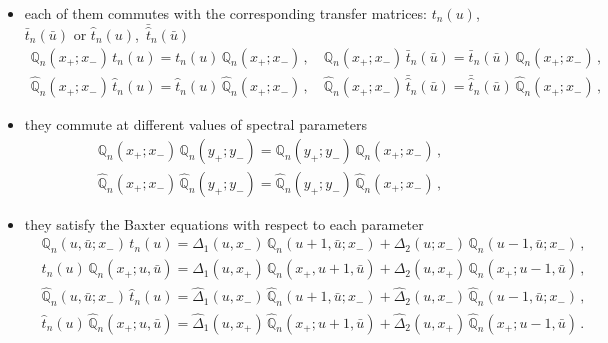 \documentclass[a4paper,11pt]{article}
\numberwithin{equation}{section}
\begin{document}
\begin{itemize}
	\item each of them commutes with the corresponding transfer matrices: $t_n(u)$,~$\bar{t}_n(\bar{u})$ or $\hat{t}_n(u)$,~$\bar{\hat{t}}_n(\bar{u})$
		\begin{equation} \label{qtcom}
			\begin{aligned}
				\mathbb{Q}_n(x_+;x_-)\,t_n(u) = t_n(u)\,\mathbb{Q}_n(x_+;x_-) \,, \quad  \mathbb{Q}_n(x_+;x_-)\,\bar{t}_n(\bar{u}) = \bar{t}_n(\bar{u})\,\mathbb{Q}_n(x_+;x_-) \,, \\
				\hat{\mathbb{Q}}_n(x_+;x_-)\,\hat{t}_n(u) = \hat{t}_n(u)\,\hat{\mathbb{Q}}_n(x_+;x_-) \,, \quad  \hat{\mathbb{Q}}_n(x_+;x_-)\,\bar{\hat{t}}_n(\bar{u}) = \bar{\hat{t}}_n(\bar{u})\,\hat{\mathbb{Q}}_n(x_+;x_-) \,,
			\end{aligned}	
		\end{equation}	
	\item they commute at different values of spectral parameters
		\begin{align}
			& \nonumber
			\mathbb{Q}_n(x_+;x_-)\,\mathbb{Q}_n(y_+;y_-) = \mathbb{Q}_n(y_+;y_-)\,\mathbb{Q}_n(x_+;x_-) \,, \\
			& \label{qqcom}
			\hat{\mathbb{Q}}_n(x_+;x_-)\,\hat{\mathbb{Q}}_n(y_+;y_-) = \hat{\mathbb{Q}}_n(y_+;y_-)\,\hat{\mathbb{Q}}_n(x_+;x_-) \,,
		\end{align}	
	\item they satisfy the Baxter equations with respect to each parameter
		\begin{align}
		\nonumber
		& \mathbb{Q}_n(u,\bar{u};x_-)\,t_n(u) = \Delta_1(u,x_-)\,\mathbb{Q}_n(u + 1,\bar{u};x_-) + \Delta_2(u;x_-)\,\mathbb{Q}_n(u - 1,\bar{u};x_-) \,, \\
		\label{baxterqeq1}
		& t_n(u)\,\mathbb{Q}_n(x_+;u,\bar{u}) = \Delta_1(u,x_+)\,\mathbb{Q}_n(x_+,u + 1,\bar{u}) + \Delta_2(u,x_+)\,\mathbb{Q}_n(x_+;u - 1,\bar{u}) \,,
		\end{align}
		\begin{align}
		\nonumber
		& \hat{\mathbb{Q}}_n(u,\bar{u};x_-)\,\hat{t}_n(u) = \hat{\Delta}_1(u,x_-)\,\hat{\mathbb{Q}}_n(u + 1,\bar{u};x_-) + \hat{\Delta}_2(u,x_-)\,\hat{\mathbb{Q}}_n(u - 1,\bar{u};x_-) \,, \\
		\label{baxterqeq2}
		& \hat{t}_n(u)\,\hat{\mathbb{Q}}_n(x_+;u,\bar{u}) = \hat{\Delta}_1(u,x_+)\,\hat{\mathbb{Q}}_n(x_+;u + 1,\bar{u}) + \hat{\Delta}_2(u,x_+)\,\hat{\mathbb{Q}}_n(x_+;u - 1,\bar{u}) \,.
		\end{align}
\end{itemize}
\end{document}
